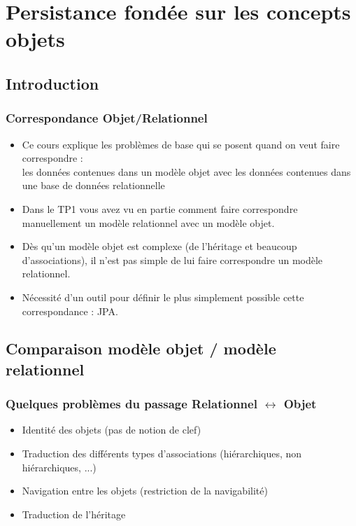\documentclass[xcolor=pdftex,x11names,table]{beamer}
\begin{document}
        
  \section{Persistance fondée sur les concepts objets}
  	\subsection{Introduction}
  	\begin{frame}
    \frametitle{Correspondance Objet/Relationnel}
		  \begin{itemize}
		  	\item Ce cours explique les problèmes de base qui se posent quand on veut faire correspondre :\\
				les données contenues dans un modèle objet avec les données contenues dans une base de données relationnelle
		  	\item Dans le TP1 vous avez vu en partie comment faire correspondre manuellement un modèle relationnel 
		  	avec un modèle objet.
		  	\item Dès qu’un modèle objet est complexe (de l’héritage et beaucoup d’associations), il n’est pas simple de lui 
		  	faire correspondre un modèle relationnel.
		  	\item Nécessité d'un outil pour définir le plus simplement possible cette correspondance : JPA.
		  \end{itemize}	
   	\end{frame}
   	
   	\subsection{Comparaison modèle objet / modèle relationnel}
   	\begin{frame}
    \frametitle{Quelques problèmes du passage Relationnel $\leftrightarrow$ Objet}
		  \begin{itemize}
		  	\item Identité des objets (pas de notion de clef)
		  	\item Traduction des différents types d'associations (hiérarchiques, non hiérarchiques, ...)
		  	\item Navigation entre les objets (restriction de la navigabilité)
		  	\item Traduction de l’héritage
		  \end{itemize}	
   	\end{frame}
\end{document}
